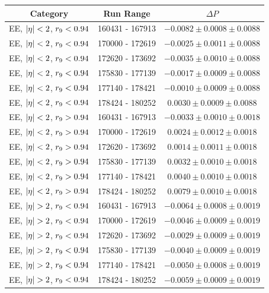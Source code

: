 \begin{table}[hbt]
\centering
\begin{tabular}{|c|c|c|}
\hline
Category & Run Range & $\Delta P$ \\
\hline
EE, $ |\eta| < 2 $, $r_{9} < 0.94$ & 160431 - 167913 & $ -0.0082 \pm 0.0008 \pm 0.0088 $\\
EE, $ |\eta| < 2 $, $r_{9} < 0.94$ & 170000 - 172619 & $ -0.0025 \pm 0.0011 \pm 0.0088 $\\
EE, $ |\eta| < 2 $, $r_{9} < 0.94$ & 172620 - 173692 & $ -0.0035 \pm 0.0010 \pm 0.0088 $\\
EE, $ |\eta| < 2 $, $r_{9} < 0.94$ & 175830 - 177139 & $ -0.0017 \pm 0.0009 \pm 0.0088 $\\
EE, $ |\eta| < 2 $, $r_{9} < 0.94$ & 177140 - 178421 & $ -0.0010 \pm 0.0009 \pm 0.0088 $\\
EE, $ |\eta| < 2 $, $r_{9} < 0.94$ & 178424 - 180252 & $ 0.0030 \pm 0.0009 \pm 0.0088 $\\
\hline
EE, $ |\eta| < 2 $, $r_{9} > 0.94$ & 160431 - 167913 & $ -0.0033 \pm 0.0010 \pm 0.0018 $\\
EE, $ |\eta| < 2 $, $r_{9} > 0.94$ & 170000 - 172619 & $ 0.0024 \pm 0.0012 \pm 0.0018 $\\
EE, $ |\eta| < 2 $, $r_{9} > 0.94$ & 172620 - 173692 & $ 0.0014 \pm 0.0011 \pm 0.0018 $\\
EE, $ |\eta| < 2 $, $r_{9} > 0.94$ & 175830 - 177139 & $ 0.0032 \pm 0.0010 \pm 0.0018 $\\
EE, $ |\eta| < 2 $, $r_{9} > 0.94$ & 177140 - 178421 & $ 0.0040 \pm 0.0010 \pm 0.0018 $\\
EE, $ |\eta| < 2 $, $r_{9} > 0.94$ & 178424 - 180252 & $ 0.0079 \pm 0.0010 \pm 0.0018 $\\
\hline
EE, $ |\eta| > 2 $, $r_{9} < 0.94$ & 160431 - 167913 & $ -0.0064 \pm 0.0008 \pm 0.0019 $\\
EE, $ |\eta| > 2 $, $r_{9} < 0.94$ & 170000 - 172619 & $ -0.0046 \pm 0.0009 \pm 0.0019 $\\
EE, $ |\eta| > 2 $, $r_{9} < 0.94$ & 172620 - 173692 & $ -0.0029 \pm 0.0009 \pm 0.0019 $\\
EE, $ |\eta| > 2 $, $r_{9} < 0.94$ & 175830 - 177139 & $ -0.0040 \pm 0.0009 \pm 0.0019 $\\
EE, $ |\eta| > 2 $, $r_{9} < 0.94$ & 177140 - 178421 & $ -0.0050 \pm 0.0008 \pm 0.0019 $\\
EE, $ |\eta| > 2 $, $r_{9} < 0.94$ & 178424 - 180252 & $ -0.0059 \pm 0.0009 \pm 0.0019 $\\

\end{tabular}
\end{table}
